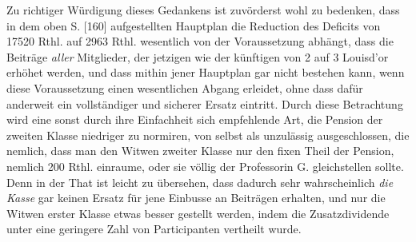 Zu richtiger Würdigung dieses Gedankens ist zuvörderst wohl zu bedenken, dass in dem oben S. [160] aufgestellten Hauptplan die Reduction des Deficits von 17520 Rthl. auf 2963 Rthl. wesentlich von der Voraussetzung abhängt, dass die Beiträge \textit{aller} Mitglieder, der jetzigen wie der künftigen von 2 auf 3 Louisd’or erhöhet werden, und dass mithin jener Hauptplan gar nicht bestehen kann, wenn diese Voraussetzung einen wesentlichen Abgang erleidet, ohne dass dafür anderweit ein vollständiger und sicherer Ersatz eintritt. Durch diese Betrachtung wird eine sonst durch ihre Einfachheit sich empfehlende Art, die Pension der zweiten Klasse niedriger zu normiren, von selbst als unzulässig ausgeschlossen, die nemlich, dass man den Witwen zweiter Klasse nur den fixen Theil der Pension, nemlich 200 Rthl. einraume, oder sie völlig der Professorin G. gleichstellen sollte. Denn in der That ist leicht zu übersehen, dass dadurch sehr wahrscheinlich \textit{die Kasse} gar keinen Ersatz für jene Einbusse an Beiträgen erhalten, und nur die Witwen erster Klasse etwas besser gestellt werden, indem die Zusatzdividende unter eine geringere Zahl von Participanten vertheilt wurde.
